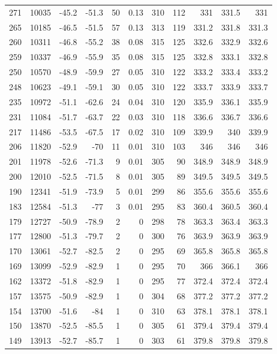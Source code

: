 \documentclass{article}
\begin{document}
\begin{longtable}{r|r|r|r|r|r|r|r|r|r|r}
271 & 10035 & -45.2 & -51.3 & 50 & 0.13 & 310 & 112 & 331 & 331.5 & 331 \\
265 & 10185 & -46.5 & -51.5 & 57 & 0.13 & 313 & 119 & 331.2 & 331.8 & 331.3 \\
260 & 10311 & -46.8 & -55.2 & 38 & 0.08 & 315 & 125 & 332.6 & 332.9 & 332.6 \\
259 & 10337 & -46.9 & -55.9 & 35 & 0.08 & 315 & 125 & 332.8 & 333.1 & 332.8 \\
250 & 10570 & -48.9 & -59.9 & 27 & 0.05 & 310 & 122 & 333.2 & 333.4 & 333.2 \\
248 & 10623 & -49.1 & -59.1 & 30 & 0.05 & 310 & 122 & 333.7 & 333.9 & 333.7 \\
235 & 10972 & -51.1 & -62.6 & 24 & 0.04 & 310 & 120 & 335.9 & 336.1 & 335.9 \\
231 & 11084 & -51.7 & -63.7 & 22 & 0.03 & 310 & 118 & 336.6 & 336.7 & 336.6 \\
217 & 11486 & -53.5 & -67.5 & 17 & 0.02 & 310 & 109 & 339.9 & 340 & 339.9 \\
206 & 11820 & -52.9 & -70 & 11 & 0.01 & 310 & 103 & 346 & 346 & 346 \\
201 & 11978 & -52.6 & -71.3 & 9 & 0.01 & 305 & 90 & 348.9 & 348.9 & 348.9 \\
200 & 12010 & -52.5 & -71.5 & 8 & 0.01 & 305 & 89 & 349.5 & 349.5 & 349.5 \\
190 & 12341 & -51.9 & -73.9 & 5 & 0.01 & 299 & 86 & 355.6 & 355.6 & 355.6 \\
183 & 12584 & -51.3 & -77 & 3 & 0.01 & 295 & 83 & 360.4 & 360.5 & 360.4 \\
179 & 12727 & -50.9 & -78.9 & 2 & 0 & 298 & 78 & 363.3 & 363.4 & 363.3 \\
177 & 12800 & -51.3 & -79.7 & 2 & 0 & 300 & 76 & 363.9 & 363.9 & 363.9 \\
170 & 13061 & -52.7 & -82.5 & 2 & 0 & 295 & 69 & 365.8 & 365.8 & 365.8 \\
169 & 13099 & -52.9 & -82.9 & 1 & 0 & 295 & 70 & 366 & 366.1 & 366 \\
162 & 13372 & -51.8 & -82.9 & 1 & 0 & 295 & 77 & 372.4 & 372.4 & 372.4 \\
157 & 13575 & -50.9 & -82.9 & 1 & 0 & 304 & 68 & 377.2 & 377.2 & 377.2 \\
154 & 13700 & -51.6 & -84 & 1 & 0 & 310 & 63 & 378.1 & 378.1 & 378.1 \\
150 & 13870 & -52.5 & -85.5 & 1 & 0 & 305 & 61 & 379.4 & 379.4 & 379.4 \\
149 & 13913 & -52.7 & -85.7 & 1 & 0 & 303 & 61 & 379.8 & 379.8 & 379.8 \\

\end{longtable}
\end{document}
